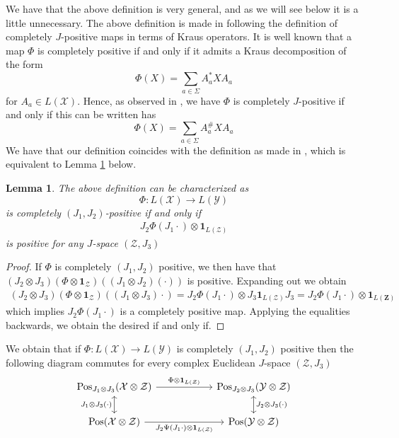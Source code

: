 \documentclass{amsart}
\numberwithin{equation}{section}
\newtheorem{lemma}[theorem]{Lemma}
\theoremstyle{definition}
\theoremstyle{plain}
\theoremstyle{solutionstyle}
\begin{document}
We have that the above definition is very general, and as we will see below it is a little unnecessary. 
The above definition is made in \cite{FelipeSosa2022} following the definition of completely $J$-positive maps in terms of Kraus operators. It is well known that a map $\Phi$ is completely positive if and only if it admits a Kraus decomposition of the form
\begin{equation*}
    \Phi(X)=\sum_{a\in \Sigma}A_a^*XA_a
\end{equation*}
for $A_a\in L(\mathcal{X})$. Hence, as observed in \cite{FelipeSosa2022}, we have $\Phi$ is completely $J$-positive if and only if this can be written has 
\begin{equation*}
    \Phi(X)=\sum_{a\in \Sigma}A_a^\#XA_a
\end{equation*}
We have that our definition coincides with the definition as made in \cite{FelipeSosa2022}, which is equivalent to Lemma \ref{lemma 6.4} below. 
\begin{lemma}\label{lemma 6.4}
    The above definition can be characterized as \begin{equation*}\Phi:L(\mathcal{X})\to L(\mathcal{Y})\end{equation*} is completely $(J_1,J_2)$-positive if and only if 
    \begin{align*}
        J_2\Phi(J_1\cdot)\otimes \mathbf{1}_{L(\mathcal{Z})} 
    \end{align*}
    is positive for any $J$-space $(\mathcal{Z},J_3)$
\end{lemma}
\begin{proof}
     If $\Phi$ is completely $(J_1,J_2)$ positive, we then have that $(J_2\otimes J_3)(\Phi\otimes \mathbf{1}_{\mathcal{Z}})((J_1\otimes J_2)(\cdot))$ is positive. Expanding out we obtain 
    \begin{align*}
        (J_2\otimes J_3)(\Phi\otimes \mathbf{1}_{\mathcal{Z}})((J_1\otimes J_3)\cdot)=J_2\Phi(J_1\cdot)\otimes J_3\mathbf{1}_{L(\mathcal{Z})}J_3=J_2\Phi(J_1\cdot)\otimes \mathbf{1}_{L(\mathbf{Z})}
    \end{align*}
    which implies $J_2\Phi(J_1\cdot)$ is a completely positive map. Applying the equalities backwards, we obtain the desired if and only if. 
\end{proof}
We obtain that if $\Phi:L(\mathcal{X})\to L(\mathcal{Y})$ is completely $(J_1,J_2)$ positive then the following diagram commutes for every complex Euclidean $J$-space $(\mathcal{Z},J_3)$
\begin{equation*}
\begin{tikzcd}[column sep=2cm]
\mathrm{Pos}_{J_1\otimes J_3}(\mathcal{X}\otimes \mathcal{Z})\arrow[r, "\Phi\otimes \mathbf{1}_{L(\mathcal{Z})}"] \arrow[d, <->, "J_1\otimes J_3(\cdot)"'] & \mathrm{Pos}_{J_2\otimes J_3}(\mathcal{Y}\otimes \mathcal{Z}) \arrow[d, <->, "J_2\otimes J_3(\cdot)"] \\
\mathrm{Pos}(\mathcal{X}\otimes \mathcal{Z}) \arrow[r, "J_2\Psi(J_1\cdot)\otimes \mathbf{1}_{L(\mathcal{Z})}"'] & \mathrm{Pos}(\mathcal{Y}\otimes \mathcal{Z})
\end{tikzcd}
\end{equation*}
\end{document}
